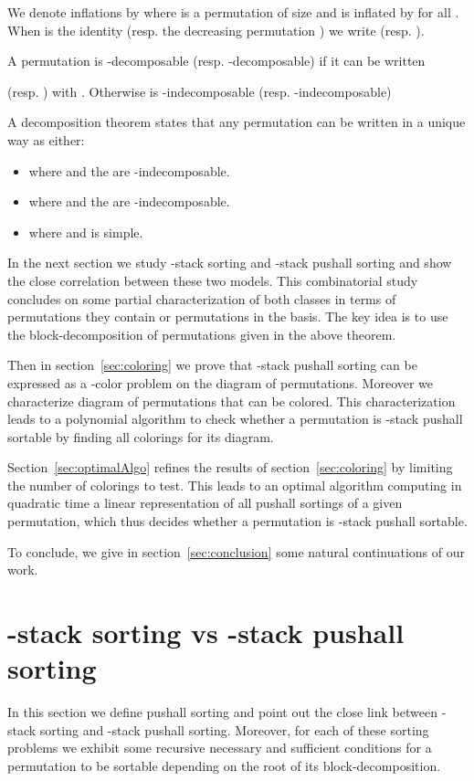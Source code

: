 \documentclass[11pt]{article}
\newcommand{\pushall}{-stack pushall sortable\xspace}
\begin{document}
We denote inflations by  where  is a permutation of size  and  is inflated by  for all .
When  is the identity  (resp. the decreasing permutation ) we write  (resp. ).

A permutation  is -decomposable (resp. -decomposable) if it can be written

(resp.  ) with .
Otherwise  is -indecomposable (resp. -indecomposable)

A decomposition theorem \cite{AA05} states that any permutation  can be written in a unique way as either:
\begin{itemize}
\item  where  and the  are -indecomposable.
\item  where  and the  are -indecomposable.
\item where  and  is simple.
\end{itemize}

In the next section we study -stack sorting and -stack pushall sorting and show the close correlation between these two models. 
This combinatorial study concludes on some partial characterization of both classes in terms of permutations they contain or permutations in the basis.
The key idea is to use the block-decomposition of permutations given in the above theorem. 

Then in section~\ref{sec:coloring} we prove that -stack pushall sorting can be expressed as a -color problem on the diagram of permutations.
Moreover we characterize diagram of permutations that can be colored. 
This characterization leads to a polynomial algorithm to check whether a permutation is -stack pushall sortable by finding all colorings for its diagram. 

Section~\ref{sec:optimalAlgo} refines the results of section~\ref{sec:coloring} by limiting the number of colorings to test.
This leads to an optimal algorithm computing in quadratic time a linear representation of all pushall sortings of a given permutation,
which thus decides whether a permutation is \pushall.

To conclude, we give in section~\ref{sec:conclusion} some natural continuations of our work.


\section{-stack sorting vs -stack pushall sorting}

In this section we define pushall sorting and point out the close link between -stack sorting and -stack pushall sorting. 
Moreover, for each of these sorting problems we exhibit some recursive necessary and sufficient conditions for a permutation to be sortable depending on the root of its block-decomposition.
\end{document}

